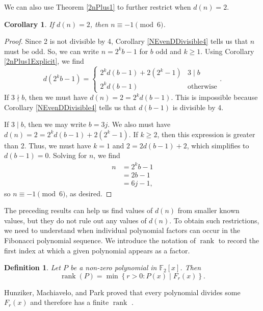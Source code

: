 \documentclass[a4paper]{article}
\newtheorem{definition}[theorem]{Definition}
\newtheorem{corollary}[theorem]{Corollary}
\newcommand{\F}{\mathbb{F}}
\begin{document}
	We can also use Theorem \ref{2nPlus1} to further restrict when $d(n) = 2$.
	\begin{corollary}\label{D2Minus1Mod6}
		If $d(n) = 2$, then $n \equiv -1 \pmod 6$.
	\end{corollary}
	\begin{proof}
		Since 2 is not divisible by 4, Corollary \ref{NEvenDDivisible4} tells us that $n$ must be odd.
		So, we can write $n = 2^k b - 1$ for $b$ odd and $k \geq 1$.
		Using Corollary \ref{2nPlus1Explicit}, we find
		\begin{equation*}
			d(2^k b - 1) = \begin{cases}
				2^k d(b-1) + 2(2^k - 1) & 3 \mid b \\
				2^k d(b-1) & \text{otherwise}
			\end{cases}.
		\end{equation*}
		If $3 \nmid b$, then we must have $d(n) = 2 = 2^k d(b-1)$.
		This is impossible because Corollary \ref{NEvenDDivisible4} tells us that $d(b-1)$ is divisible by 4.
		
		If $3 \mid b$, then we may write $b = 3j$.
		We also must have $d(n) = 2 = 2^k d(b-1) + 2(2^k - 1)$.
		If $k \geq 2$, then this expression is greater than 2.
		Thus, we must have $k=1$ and $2 = 2 d(b-1) + 2$, which simplifies to $d(b-1) = 0$.
		Solving for $n$, we find
		\begin{align*}
			n &= 2^k b - 1 \\
			&= 2b - 1 \\
			&= 6j - 1,
		\end{align*}
		so $n \equiv -1 \pmod 6$, as desired.
	\end{proof}

	The preceding results can help us find values of $d(n)$ from smaller known values, but they do not rule out any values of $d(n)$.
	To obtain such restrictions, we need to understand when individual polynomial factors can occur in the Fibonacci polynomial sequence.
	We introduce the notation of $\operatorname{rank}$ to record the first index at which a given polynomial appears as a factor.
	\begin{definition}
		Let $P$ be a non-zero polynomial in $\F_2[x]$.
		Then 
		\begin{equation*}
			\operatorname{rank}(P) = \min{\left\{r > 0 : P(x) \mid F_r(x)\right\}}.
		\end{equation*}
	\end{definition}
	Hunziker, Machiavelo, and Park proved that every polynomial divides some $F_r(x)$ and therefore has a finite $\operatorname{rank}$ \cite[Corollary 2.8]{HUNZIKER2004465}.
	
\end{document}
